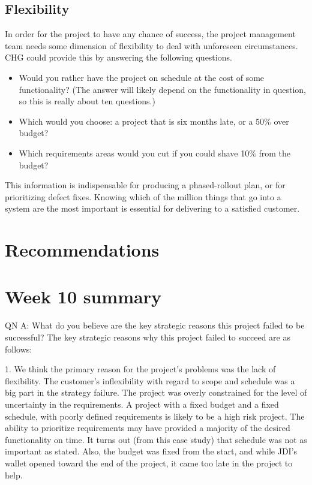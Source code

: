 \documentclass[12pt]{article}
\newif\iftodo
\begin{document}
\subsection{Flexibility}
In order for the project to have any chance of success, the project management team needs some
dimension of flexibility to deal with unforeseen circumstances.  CHG could provide this by answering
the following questions.

\begin{itemize}
\item Would you rather have the project on schedule at the cost of some functionality?  (The answer
  will likely depend on the functionality in question, so this is really about ten questions.)
\item Which would you choose: a project that is six months late, or a 50\% over budget?
\item Which requirements areas would you cut if you could shave 10\% from the budget?
\end{itemize}

This information is indispensable for producing a phased-rollout plan, or for prioritizing defect
fixes.  Knowing which of the million things that go into a system are the most important is
essential for delivering to a satisfied customer.
\todo{}


\section{Recommendations}



\iftodo
\section{Week 10 summary}

QN A: What do you believe are the key strategic reasons this project failed to be successful?  The
key strategic reasons why this project failed to succeed are as follows:

1.  We think the primary reason for the project’s problems was the lack of flexibility.  The
customer’s inflexibility with regard to scope and schedule was a big part in the strategy failure.
The project was overly constrained for the level of uncertainty in the requirements.  A project with
a fixed budget and a fixed schedule, with poorly defined requirements is likely to be a high risk
project.  The ability to prioritize requirements may have provided a majority of the desired
functionality on time.  It turns out (from this case study) that schedule was not as important as
stated.  Also, the budget was fixed from the start, and while JDI's wallet opened toward the end of
the project, it came too late in the project to help.
\end{document}
